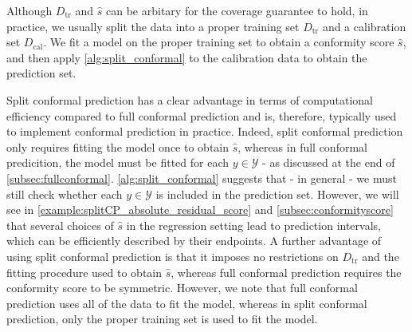 \documentclass[11pt, titlepage]{article} %
\numberwithin{equation}{section}
\theoremstyle{definition}
\numberwithin{theorem}{section}
\numberwithin{lemma}{section}
\numberwithin{corollary}{section}
\numberwithin{proposition}{section}
\numberwithin{definition}{section}
\numberwithin{remark}{section}
\begin{document}
\noindent
Although \(D_\mathrm{tr}\) and \(\hat{s}\) can be arbitary for the coverage guarantee to hold, in practice, we usually split the data into a proper training set \(D_\mathrm{tr}\) and a calibration set \(D_\mathrm{cal}\). We fit a model on the proper training set to obtain a conformity score \(\hat{s}\), and then apply \cref{alg:split_conformal} to the calibration data to obtain the prediction set. \vskip5pt

\noindent
Split conformal prediction has a clear advantage in terms of computational efficiency compared to full conformal prediction and is, therefore, typically used to implement conformal prediction in practice. Indeed, split conformal prediction only requires fitting the model once to obtain \(\hat{s}\), whereas in full conformal predicition, the model must be fitted for each \(y \in \mathcal{Y}\) - as discussed at the end of \cref{subsec:fullconformal}. \cref{alg:split_conformal} suggests that - in general - we must still check whether each \(y \in \mathcal{Y}\) is included in the prediction set. However, we will see in \cref{example:splitCP_absolute_residual_score} and \cref{subsec:conformityscore} that several choices of \(\hat{s}\) in the regression setting lead to prediction intervals, which can be efficiently described by their endpoints. A further advantage of using split conformal prediction is that it imposes no restrictions on \(D_\mathrm{tr}\) and the fitting procedure used to obtain \(\hat{s}\), whereas full conformal prediction requires the conformity score to be symmetric. However, we note that full conformal prediction uses all of the data to fit the model, whereas in split conformal prediction, only the proper training set is used to fit the model.
\end{document}
